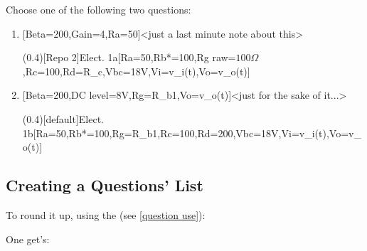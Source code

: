 \documentclass[10pt]{article}
\begin{document}
Choose one of the following two questions:

\begin{enumerate}
  \item {}[Beta=200,Gain=4,Ra=50\Omega]<just a last minute note about this>\par
  \ftikzQuestion(0.4)[Repo 2]{Elect. 1a}[Ra=50\Omega,Rb*=100\Omega,Rg raw=$100\Omega$,Rc=100\Omega,Rd=R_c,Vbc=18V,Vi=v_i(t),Vo=v_o(t)]
  
  \item {}[Beta=200,DC level=8V,Rg=R_{b1},Vo=v_o(t)]<just for the sake of it...>\par
  \ftikzQuestion(0.4)[default]{Elect. 1b}[Ra=50\Omega,Rb*=100\Omega,Rg=R_{b1},Rc=100\Omega,Rd=200\Omega,Vbc=18V,Vi=v_i(t),Vo=v_o(t)]
\end{enumerate}

\subsection{Creating a Questions' List}
To round it up, using the \tsobj{\QuestionsList} (see \ref{question use}):
\begin{codestore}[Qlist]
\QuestionsList
\end{codestore}


One get's: 

\QuestionsList
\end{document}

